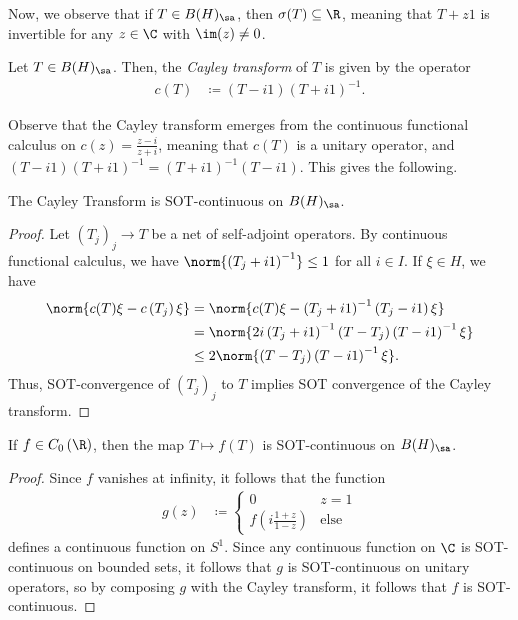 \documentclass[10pt]{mypackage}
\begin{document}
Now, we observe that if $T\in B(H)_{\sa}$, then $\sigma(T)\subseteq \R$, meaning that $T + z1$ is invertible for any $z\in \C$ with $\im(z)\neq 0$.
\begin{definition}
  Let $T\in B(H)_{\sa}$. Then, the \textit{Cayley transform} of $T$ is given by the operator
  \begin{align*}
    c(T) &\coloneq \left( T-i1 \right)\left( T + i1 \right)^{-1}.
  \end{align*}
\end{definition}
Observe that the Cayley transform emerges from the continuous functional calculus on $c(z) = \frac{z-i}{z+i}$, meaning that $c(T)$ is a unitary operator, and $\left( T-i1 \right)\left( T+i1 \right)^{-1} = \left( T+i1 \right)^{-1}\left( T-i1 \right)$. This gives the following.
\begin{proposition}
  The Cayley Transform is SOT-continuous on $B(H)_{\sa}$.
\end{proposition}
\begin{proof}
  Let $\left( T_j \right)_j\rightarrow T$ be a net of self-adjoint operators. By continuous functional calculus, we have $\norm{\left( T_j + i1 \right)^{-1}}\leq 1$ for all $i\in I$. If $\xi\in H$, we have
  \begin{align*}
    \norm{c(T)\xi-c\left(T_j\right)\xi} &= \norm{c(T)\xi - \left( T_j+i1 \right)^{-1}\left( T_j-i1 \right)\xi}\\
                                        &= \norm{2i\left( T_j+i1 \right)^{-1}\left( T-T_j \right)\left( T-i1 \right)^{-1}\xi}\\
                                        &\leq 2\norm{\left( T-T_j \right)\left( T-i1 \right)^{-1}\xi}.
  \end{align*}
  Thus, SOT-convergence of $\left( T_j \right)_j$ to $T$ implies SOT convergence of the Cayley transform.
\end{proof}
\begin{corollary}
  If $f\in C_0\left(\R\right)$, then the map $T\mapsto f(T)$ is SOT-continuous on $B(H)_{\sa}$.
\end{corollary}
\begin{proof}
  Since $f$ vanishes at infinity, it follows that the function
  \begin{align*}
    g(z) &\coloneq \begin{cases}
      0 & z = 1\\
      f\left( i\frac{1+z}{1-z} \right) & \text{else}
    \end{cases}
  \end{align*}
  defines a continuous function on $S^1$. Since any continuous function on $\C$ is SOT-continuous on bounded sets, it follows that $g$ is SOT-continuous on unitary operators, so by composing $g$ with the Cayley transform, it follows that $f$ is SOT-continuous.
\end{proof}
\end{document}
